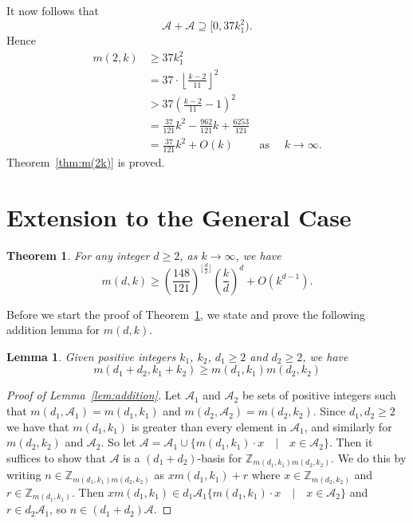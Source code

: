 \documentclass[11pt]{article}
\newtheorem{theorem}{Theorem}[section]
\newtheorem{lemma}{Lemma}[section]
\theoremstyle{definition}
\begin{document}
It now follows that 
\[
\mathscr{A} + \mathscr{A} \supseteq [0, 37k_1^2).
\]
Hence
\begin{align*}
m(2,k) &\geq 37k_1^2\\
&= 37 \cdot \left \lfloor \frac{k - 2}{11}\right \rfloor^2\\
&> 37 \left(\frac{k - 2}{11} -1\right) ^2\\
&= \frac{37}{121}k^2-\frac{962}{121}k+\frac{6253}{121}\\
&= \frac{37}{121}k^2 + O(k)\qquad \text{ as }\quad k \to \infty. 
\end{align*}
Theorem~\ref{thm:m(2k)} is proved.

\section{Extension to the General Case}
\begin{theorem}\label{thm:m(dk)}
For any integer $d \geq 2$, as $k \to \infty$, we have 
\[
m(d,k) \geq \left(\frac{148}{121}\right)^{\lfloor \frac{d}{2}\rfloor}\left(\frac{k}{d}\right)^d + O(k^{d-1}).
\]
\end{theorem}
Before we start the proof of Theorem~\ref{thm:m(dk)}, we state and prove the following addition lemma for $m(d,k)$. 
\begin{lemma}\label{lemma:addition}
Given positive integers $k_{1}$, $k_{2}$, $d_{1}\ge2$ and $d_{2}\ge 2$, we have
\[
m(d_1+d_2,k_1+k_2) \geq m(d_1,k_1)m(d_2,k_2) 
\]
\end{lemma}
\begin{proof}[Proof of Lemma~\ref{lem:addition}]
Let $\mathscr{A}_1$ and $\mathscr{A}_2$ be sets of positive integers such that $m(d_1,\mathscr{A}_1) = m(d_1,k_1)$ and $m(d_2,\mathscr{A}_2) = m(d_2,k_2)$.  Since $d_1, d_2 \geq 2$ we have that $m(d_1,k_1)$ is greater than every element in $\mathscr{A}_1$, and similarly for $m(d_2,k_2)$ and $\mathscr{A}_2$.  So let $\mathscr{A} = \mathscr{A}_1 \cup \{m(d_1,k_1)\cdot x \quad \vert \quad x \in \mathscr{A}_2\}$.  Then it suffices to show that $\mathscr{A}$ is a $(d_1+d_2)$-basis for $\mathbb{Z}_{m(d_1,k_1)m(d_2,k_2)}$.  We do this by writing $n \in \mathbb{Z}_{m(d_1,k_1)m(d_2,k_2)}$ as $xm(d_1,k_1) + r$ where $x \in \mathbb{Z}_{m(d_2,k_2)}$ and $r \in \mathbb{Z}_{m(d_1,k_1)}$.  Then $xm(d_1,k_1) \in d_1\mathscr{A}_1\{m(d_1,k_1)\cdot x \quad \vert \quad x \in \mathscr{A}_2\}$ and $r \in d_2\mathscr{A}_1$, so $n \in (d_1+d_2)\mathscr{A}$.
\end{proof}
\end{document}
